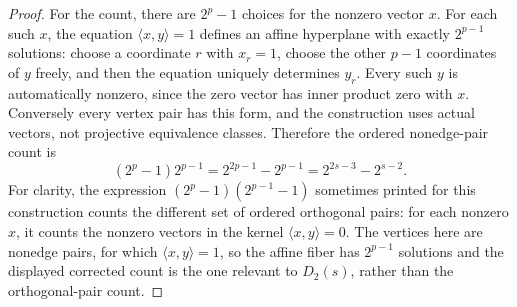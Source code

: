 \begin{proof}
For the count, there are $2^p-1$ choices for the nonzero vector $x$.  For
each such $x$, the equation $\langle x,y\rangle=1$ defines an affine
hyperplane with exactly $2^{p-1}$ solutions: choose a coordinate $r$ with
$x_r=1$, choose the other $p-1$ coordinates of $y$ freely, and then the
equation uniquely determines $y_r$.  Every such $y$ is automatically
nonzero, since the zero vector has inner product zero with $x$.  Conversely
every vertex pair has this form, and the construction uses actual vectors,
not projective equivalence classes.  Therefore the ordered nonedge-pair
count is
\[
 (2^p-1)2^{p-1}=2^{2p-1}-2^{p-1}=2^{2s-3}-2^{s-2}.
\]
For clarity, the expression $(2^p-1)(2^{p-1}-1)$ sometimes printed for
this construction counts the different set of ordered orthogonal pairs:
for each nonzero $x$, it counts the nonzero vectors in the kernel
$\langle x,y\rangle=0$.  The vertices here are nonedge pairs, for which
$\langle x,y\rangle=1$, so the affine fiber has $2^{p-1}$ solutions and
the displayed corrected count is the one relevant to $D_2(s)$, rather than
the orthogonal-pair count.
\end{proof}
